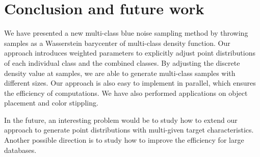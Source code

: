 \section{Conclusion and future work}
We have presented a new multi-class blue noise sampling method by
throwing samples as a  Wasserstein barycenter of multi-class density function.
Our approach introduces weighted parameters to explicitly adjust point distributions of each individual class and the combined classes.
By adjusting the discrete density value at samples,
we are able to generate multi-class samples with different sizes.
Our approach is also easy to implement in parallel, which ensures the efficiency of computations.
We have also performed applications on object placement and color stippling.

In the future,
an interesting problem would be to study how to extend our approach to generate point distributions with multi-given target characteristics.
Another possible direction is to study how to improve the efficiency for large databases.